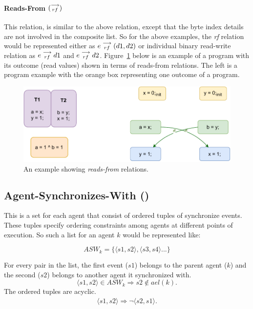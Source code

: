             \paragraph{Reads-From $(\stackrel{\longrightarrow}{_{rf}})$}
            This relation, is similar to the above relation, except that the byte index details are not involved in the composite list. 
            So for the above examples, the \textit{rf} relation would be represented either as   
                $e\stackrel{\longrightarrow}{_{rf}}(d1, d2)$
            or individual binary read-write relation as 
                $e\stackrel{\longrightarrow}{_{rf}}d1$ and $e\stackrel{\longrightarrow}{_{rf}}d2$.
            Figure~\ref{model:read-from} below is an example of a program with its outcome (read values) shown in terms of reads-from relations.
            The left is a program example with the orange box representing one outcome of a program. 
            \begin{figure}[H]
                \centering
                \includegraphics[scale=0.7]{3.ECMAScriptMemoryModel/ReadsFrom.pdf}
                \caption{An example showing \textit{reads-from} relations.}
                \label{model:read-from}
            \end{figure}
            
        \subsection{Agent-Synchronizes-With ()}
            This is a set for each agent that consist of ordered tuples of synchronize events. 
            These tuples specify ordering constraints among agents at different points of execution. 
            So such a list for an agent $k$ would be represented like:  

                \[ASW_k = \{ \langle s1, s2 \rangle, \langle s3, s4 \rangle ...\}\]
        
            For every pair in the list, the first event ($s1$) belongs to the parent agent ($k$) and the second ($s2$) belongs to another agent it synchronized with\footnotemark.
                \[  
                    \langle s1, s2 \rangle \in ASW_k 
                    \Rightarrow{} 
                    s2 \notin ael(k).                        
                \]
            The ordered tuples are acyclic.
            \begin{align*}
                \langle s1, s2 \rangle \Rightarrow \neg \langle s2, s1 \rangle.
            \end{align*}

